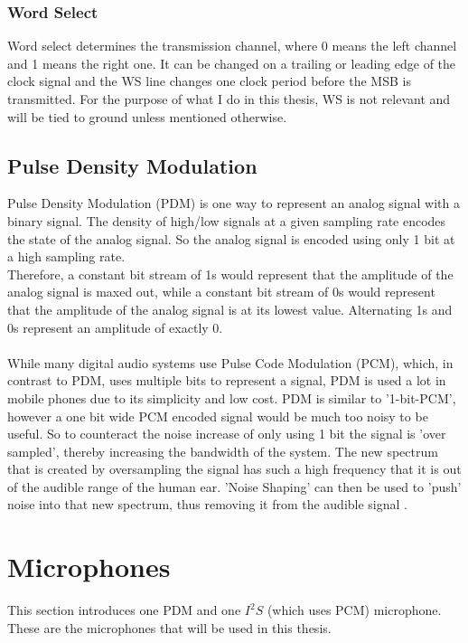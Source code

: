 \subsubsection{Word Select}

Word select determines the transmission channel, where 0 means the left channel and 1 means the right one.
It can be changed on a trailing or leading edge of the clock signal and the WS line changes one clock period
before the MSB is transmitted.
For the purpose of what I do in this thesis, WS is not relevant and will be tied to ground unless mentioned otherwise.

\subsection{Pulse Density Modulation}

Pulse Density Modulation (PDM) is one way to represent an analog signal with a binary signal.
The density of high/low signals at a given sampling rate encodes the state of the analog signal.
So the analog signal is encoded using only 1 bit at a high sampling rate.\\
Therefore, a constant bit stream of 1s would represent that the amplitude of the analog signal is maxed out,
while a constant bit stream of 0s would represent that the amplitude of the analog signal is at its lowest value.
Alternating 1s and 0s represent an amplitude of exactly 0.\\\\
While many digital audio systems use Pulse Code Modulation (PCM), which, in contrast to PDM, uses multiple bits to represent a signal,
PDM is used a lot in mobile phones \cite{pdm_utexas} due to its simplicity and low cost.
PDM is similar to '1-bit-PCM', however a one bit wide PCM encoded signal would be much too noisy to be useful.
So to counteract the noise increase of only using 1 bit the signal is 'over sampled', thereby increasing the bandwidth of the system.
The new spectrum that is created by oversampling the signal has such a high frequency that it is out of the audible range of the human ear.
'Noise Shaping' can then be used to 'push' noise into that new spectrum, thus removing it from the audible signal \cite{pdm_texas}.

\section{Microphones}

This section introduces one PDM and one $I^2S$ (which uses PCM) microphone.
These are the microphones that will be used in this thesis.

